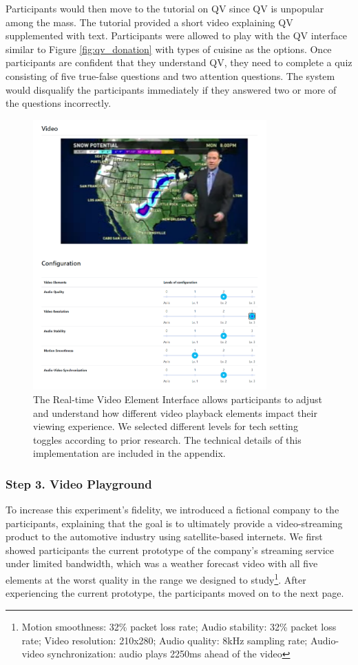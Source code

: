 Participants would then move to the tutorial on QV since QV is unpopular among the mass. The tutorial provided a short video explaining QV supplemented with text. Participants were allowed to play with the QV interface similar to Figure \ref{fig:qv_donation} with types of cuisine as the options. Once participants are confident that they understand QV, they need to complete a quiz consisting of five true-false questions and two attention questions. The system would disqualify the participants immediately if they answered two or more of the questions incorrectly.

\begin{figure}[htpb]
    \centering
    \includegraphics[width=0.8\textwidth, keepaspectratio=true]{content/image/video_playground.png}
    \caption{
        The Real-time Video Element Interface allows participants to adjust and understand how different video playback elements impact their viewing experience. We selected different levels for tech setting toggles according to prior research. The technical details of this implementation are included in the appendix.
    }
    \label{fig:exp2_playground}
\end{figure}


\subsubsection{Step 3. Video Playground}
To increase this experiment's fidelity, we introduced a fictional company to the participants, explaining that the goal is to ultimately provide a video-streaming product to the automotive industry using satellite-based internets. We first showed participants the current prototype of the company's streaming service under limited bandwidth, which was a weather forecast video with all five elements at the worst quality in the range we designed to study\footnote{Motion smoothness: 32\% packet loss rate; Audio stability: 32\% packet loss rate; Video resolution: 210x280; Audio quality: 8kHz sampling rate; Audio-video synchronization: audio plays 2250ms ahead of the video}. After experiencing the current prototype, the participants moved on to the next page.

